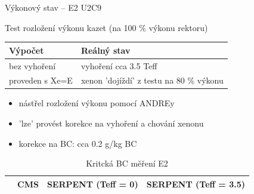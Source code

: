 \documentclass{beamer}
\begin{document}
\begin{frame}{Výkonový stav -- E2 U2C9}

\begin{block}{}\small
	Test rozložení výkonu kazet (na 100 \% výkonu rektoru)
\end{block}

\begin{table}[h]\scriptsize
	\begin{center}
		\begin{tabular}{ll}
Výpočet & Reálný stav \\			
			\toprule
bez vyhoření & vyhoření cca 3.5 Teff \\
proveden s Xe=E & xenon 'dojíždí' z testu na 80 \% výkonu \\
			\bottomrule
		\end{tabular}
	\end{center}
\end{table}

\begin{itemize}\footnotesize
	\item nástřel rozložení výkonu pomocí ANDREy
	\item 'lze' provést korekce na vyhoření a chování xenonu
	\item korekce na BC: cca 0.2 g/kg BC

\end{itemize}
	
\begin{table}[h]\scriptsize
	\begin{center}
		\begin{tabular}{cccc}
			\toprule
			& CMS    & SERPENT (\tiny Teff = 0) & SERPENT (\tiny Teff = 3.5) \\
			\midrule
			
			\bottomrule
		\end{tabular}
		\caption{\footnotesize Kritcká BC měření E2}
	\end{center}
\end{table}
\end{frame}
\end{document}

